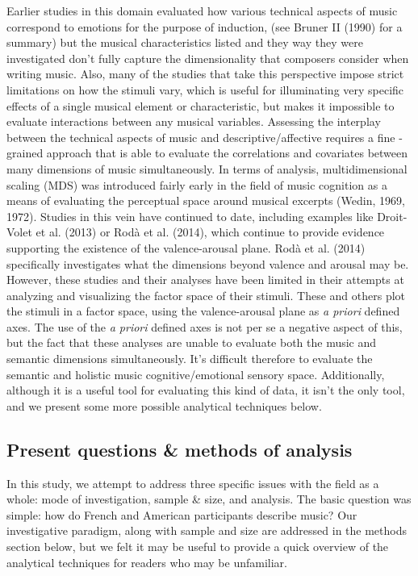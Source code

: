 \documentclass[
  english,
  man,floatsintext]{apa6}
\begin{document}
Earlier studies in this domain evaluated how various technical aspects of music correspond to emotions for the purpose of induction, (see Bruner II (1990) for a summary) but the musical characteristics listed and they way they were investigated don't fully capture the dimensionality that composers consider when writing music. Also, many of the studies that take this perspective impose strict limitations on how the stimuli vary, which is useful for illuminating very specific effects of a single musical element or characteristic, but makes it impossible to evaluate interactions between any musical variables. Assessing the interplay between the technical aspects of music and descriptive/affective requires a fine - grained approach that is able to evaluate the correlations and covariates between many dimensions of music simultaneously.
In terms of analysis, multidimensional scaling (MDS) was introduced fairly early in the field of music cognition as a means of evaluating the perceptual space around musical excerpts (Wedin, 1969, 1972). Studies in this vein have continued to date, including examples like Droit-Volet et al. (2013) or Rodà et al. (2014), which continue to provide evidence supporting the existence of the valence-arousal plane. Rodà et al. (2014) specifically investigates what the dimensions beyond valence and arousal may be. However, these studies and their analyses have been limited in their attempts at analyzing and visualizing the factor space of their stimuli. These and others plot the stimuli in a factor space, using the valence-arousal plane as \emph{a priori} defined axes. The use of the \emph{a priori} defined axes is not per se a negative aspect of this, but the fact that these analyses are unable to evaluate both the music and semantic dimensions simultaneously. It's difficult therefore to evaluate the semantic and holistic music cognitive/emotional sensory space. Additionally, although it is a useful tool for evaluating this kind of data, it isn't the only tool, and we present some more possible analytical techniques below.

\hypertarget{present-questions-methods-of-analysis}{%
\subsection{Present questions \& methods of analysis}\label{present-questions-methods-of-analysis}}

In this study, we attempt to address three specific issues with the field as a whole: mode of investigation, sample \& size, and analysis. The basic question was simple: how do French and American participants describe music? Our investigative paradigm, along with sample and size are addressed in the methods section below, but we felt it may be useful to provide a quick overview of the analytical techniques for readers who may be unfamiliar.
\end{document}
